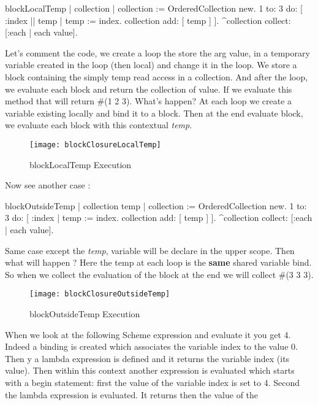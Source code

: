 \documentclass[a4paper,10pt,twoside]{book}
\begin{document}
\begin{code}{}
blockLocalTemp
	| collection |
		collection := OrderedCollection new.
		1 to: 3 do: [ :index || temp |
			temp := index. 
			collection add: [ temp ] ].
		^collection collect: [:each | each value].
\end{code}

Let's comment the code, we create a loop the store the arg value, in a temporary variable created in the loop (then local) and change it in the loop. We store a block containing the simply temp read access in a collection. And after the loop, we evaluate each block and return the collection of value.
If we evaluate this method that will return \#(1 2 3). What's happen? At each loop we create a variable existing locally and bind it to a block. Then at the end evaluate block, we evaluate each block with this contextual \emph{temp}. 

\begin{figure}[htbp]
	\centering
        \texttt{[image: blockClosureLocalTemp]}
	\caption{blockLocalTemp Execution}
	\label{fig:blockLocalTempExecution}
\end{figure}


\newpage
Now see another case : 
\begin{code}{}
blockOutsideTemp
		| collection temp |
		collection := OrderedCollection new.
		1 to: 3 do: [ :index | 
			temp := index. 
			collection add: [ temp ] ].
		^collection collect: [:each | each value].
\end{code}
Same case except the \emph{temp}, variable will be  declare in the upper scope. Then what will happen ? Here the temp at each loop is the \textbf{same} shared variable bind. So when we collect the evaluation of the block at the end we will collect \#(3 3 3).
\begin{figure}[htbp]
	\centering
		\texttt{[image: blockClosureOutsideTemp]}
	\caption{blockOutsideTemp Execution}
	\label{fig:blockClosureOutsideTemp}
\end{figure}




When we look at the following Scheme expression and evaluate it you get 4. Indeed a binding is created 
which associates the variable index to the value 0. Then y a lambda expression is defined and it returns
 the variable index (its value). Then within this context another expression is evaluated which starts
with a begin statement: first the value of the variable index is set to 4. Second the lambda expression is 
evaluated. It returns then the value of the 
\end{document}

